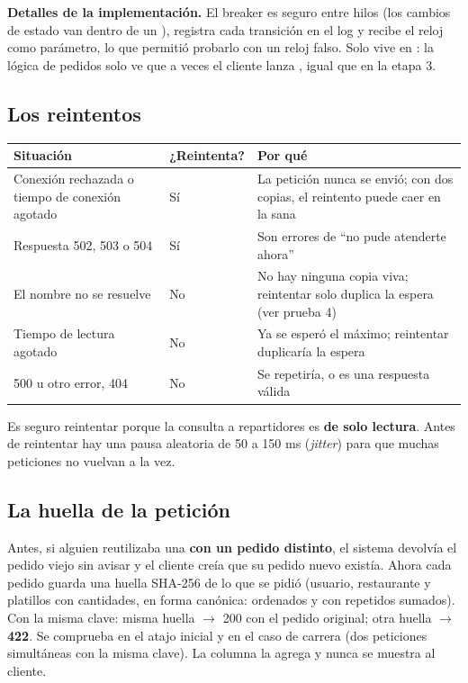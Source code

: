 \documentclass[11pt]{article}
\begin{document}
\textbf{Detalles de la implementación.} El breaker es seguro entre hilos (los cambios de estado van
dentro de un ), registra cada transición en el log y recibe el reloj como parámetro, lo que
permitió probarlo con un reloj falso. Solo vive en : la lógica de
pedidos solo ve que a veces el cliente lanza , igual que en la etapa 3.

\subsection{Los reintentos}\label{sec:reintentos}

\begin{tabularx}{\linewidth}{@{}X l X@{}}
\toprule
\textsf{\textbf{Situación}} & \textsf{\textbf{¿Reintenta?}} & \textsf{\textbf{Por qué}} \\
\midrule
Conexión rechazada o tiempo de conexión agotado & Sí & La petición nunca se envió; con dos copias, el reintento puede caer en la sana \\
Respuesta 502, 503 o 504 & Sí & Son errores de ``no pude atenderte ahora'' \\
El nombre no se resuelve & No & No hay ninguna copia viva; reintentar solo duplica la espera (ver prueba 4) \\
Tiempo de lectura agotado & No & Ya se esperó el máximo; reintentar duplicaría la espera \\
500 u otro error, 404 & No & Se repetiría, o es una respuesta válida \\
\bottomrule
\end{tabularx}

Es seguro reintentar porque la consulta a repartidores es \textbf{de solo lectura}. Antes de reintentar
hay una pausa aleatoria de 50 a 150 ms (\emph{jitter}) para que muchas peticiones no vuelvan a la vez.

\subsection{La huella de la petición}

Antes, si alguien reutilizaba una  \textbf{con un pedido distinto}, el sistema
devolvía el pedido viejo sin avisar y el cliente creía que su pedido nuevo existía. Ahora cada pedido
guarda una huella SHA-256 de lo que se pidió (usuario, restaurante y platillos con cantidades, en forma
canónica: ordenados y con repetidos sumados). Con la misma clave: misma huella $\rightarrow$ 200 con el
pedido original; otra huella $\rightarrow$ \textbf{422}. Se comprueba en el atajo inicial y en el caso de
carrera (dos peticiones simultáneas con la misma clave). La columna la agrega  y
nunca se muestra al cliente.
\end{document}
